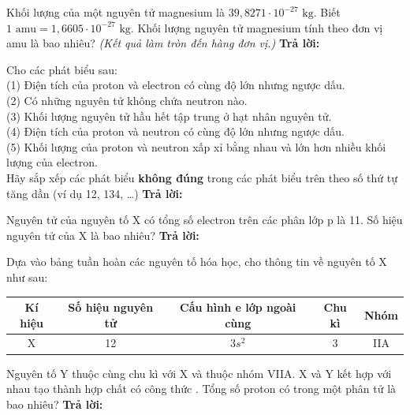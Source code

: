 \documentclass[11pt,a4paper]{article}
\begin{document}
\begin{ex}
Khối lượng của một nguyên tử magnesium là $39,8271 \cdot 10^{-27}\text{ kg}$. Biết $1\text{ amu} = 1,6605 \cdot 10^{-27}\text{ kg}$. Khối lượng nguyên tử magnesium tính theo đơn vị amu là bao nhiêu? \textit{(Kết quả làm tròn đến hàng đơn vị.)}
\newline\textbf{Trả lời:} \dotfill
\end{ex}

\begin{ex}
Cho các phát biểu sau:\\
(1) Điện tích của proton và electron có cùng độ lớn nhưng ngược dấu.\\
(2) Có những nguyên tử không chứa neutron nào.\\
(3) Khối lượng nguyên tử hầu hết tập trung ở hạt nhân nguyên tử.\\
(4) Điện tích của proton và neutron có cùng độ lớn nhưng ngược dấu.\\
(5) Khối lượng của proton và neutron xấp xỉ bằng nhau và lớn hơn nhiều khối lượng của electron.\\
Hãy sắp xếp các phát biểu \textbf{không đúng} trong các phát biểu trên theo số thứ tự tăng dần (ví dụ 12, 134, \dots)
\newline\textbf{Trả lời:} \dotfill
\end{ex}

\begin{ex}
Nguyên tử của nguyên tố X có tổng số electron trên các phân lớp p là 11. Số hiệu nguyên tử của X là bao nhiêu?
\newline\textbf{Trả lời:} \dotfill
\end{ex}

\begin{ex}
Dựa vào bảng tuần hoàn các nguyên tố hóa học, cho thông tin về nguyên tố X như sau:
\begin{center}
\begin{tabular}{|c|c|c|c|c|}
\hline
\textbf{Kí hiệu} & \textbf{Số hiệu nguyên tử} & \textbf{Cấu hình e lớp ngoài cùng} & \textbf{Chu kì} & \textbf{Nhóm} \\
\hline
X & 12 & $3s^2$ & 3 & IIA \\
\hline
\end{tabular}
\end{center}
Nguyên tố Y thuộc cùng chu kì với X và thuộc nhóm VIIA. X và Y kết hợp với nhau tạo thành hợp chất có công thức . Tổng số proton có trong một phân tử  là bao nhiêu?
\newline\textbf{Trả lời:} \dotfill
\end{ex}
\end{document}
